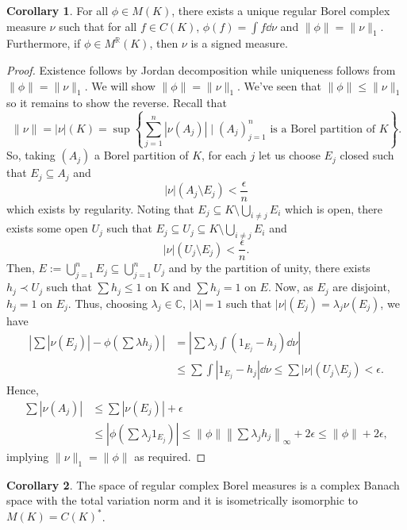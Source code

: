 \documentclass[]{article}
\theoremstyle{definition}
\newtheorem{corollary}{Corollary}[theorem]
\begin{document}
\begin{corollary}
  For all \(\phi \in M(K)\), there exists a unique regular Borel complex measure \(\nu\) such that 
  for all \(f \in C(K)\), \(\phi(f) = \int f \dd \nu\) and \(\|\phi\| = \|\nu\|_1\). Furthermore, if 
  \(\phi \in M^\mathbb{R}(K)\), then \(\nu\) is a signed measure.
\end{corollary}
\begin{proof}
  Existence follows by Jordan decomposition while uniqueness follows from \(\|\phi\| = \|\nu\|_1\). 
  We will show \(\|\phi\| = \|\nu\|_1\). We've seen that \(\|\phi\| \le \|\nu\|_1\) so it remains to 
  show the reverse. Recall that 
  \[\|\nu\| = |\nu|(K) = \sup \left\{\sum_{j = 1}^n |\nu(A_j)| \mid (A_j)_{j = 1}^n \text{ is a Borel partition of } K\right\}.\]
  So, taking \((A_j)\) a Borel partition of \(K\), for each \(j\) let us choose \(E_j\) closed such that 
  \(E_j \subseteq A_j\) and 
  \[|\nu|(A_j \setminus E_j) < \frac{\epsilon}{n}\]
  which exists by regularity. Noting that \(E_j \subseteq K \setminus \bigcup_{i \neq j} E_i\) which is 
  open, there exists some open \(U_j\) such that \(E_j \subseteq U_j \subseteq K \setminus \bigcup_{i \neq j} E_i\)
  and 
  \[|\nu|(U_j \setminus E_j) < \frac{\epsilon}{n}.\]
  Then, \(E := \bigcup_{j = 1}^n E_j \subseteq \bigcup_{j = 1}^n U_j\) and by the partition of unity, 
  there exists \(h_j \prec U_j\) such that \(\sum h_j \le 1\) on K and \(\sum h_j = 1\) on \(E\). 
  Now, as \(E_j\) are disjoint, \(h_j = 1\) on \(E_j\). Thus, choosing \(\lambda_j \in \mathbb{C}\), 
  \(|\lambda| = 1\) such that \(|\nu|(E_j) = \lambda_j \nu(E_j)\), we have 
  \begin{align*}
    \left|\sum |\nu(E_j)| - \phi\left(\sum\lambda h_j\right)\right| 
      & = \left|\sum \lambda_j \int (1_{E_j} - h_j) \dd \nu\right|\\
      & \le \sum \int |1_{E_j} - h_j| \dd \nu \le \sum |\nu|(U_j \setminus E_j) < \epsilon.
  \end{align*}
  Hence, 
  \begin{align*}
    \sum |\nu(A_j)| & \le \sum |\nu(E_j)| + \epsilon \\
    & \le \left|\phi\left(\sum \lambda_j 1_{E_j}\right)\right| 
      \le \|\phi\| \left\| \sum \lambda_j h_j\right\|_\infty + 2\epsilon 
      \le \|\phi\| + 2\epsilon,
  \end{align*}
  implying \(\|\nu\|_1 = \|\phi\|\) as required.
\end{proof}

\begin{corollary}
  The space of regular complex Borel measures is a complex Banach space with the total variation 
  norm and it is isometrically isomorphic to \(M(K) = C(K)^*\).
\end{corollary}
\end{document}
